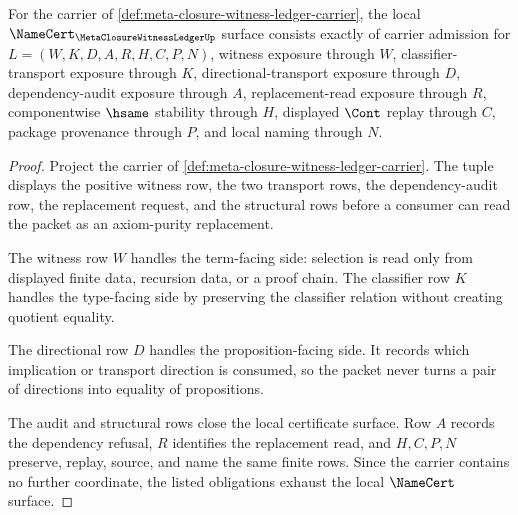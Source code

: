 \begin{theorem}
\label{thm:meta-closure-witness-ledger-namecert-obligations}
For the carrier of \autoref{def:meta-closure-witness-ledger-carrier}, the local $\NameCert_{\MetaClosureWitnessLedgerUp}$ surface consists exactly of carrier admission for $L=(W,K,D,A,R,H,C,P,N)$, witness exposure through $W$, classifier-transport exposure through $K$, directional-transport exposure through $D$, dependency-audit exposure through $A$, replacement-read exposure through $R$, componentwise $\hsame$ stability through $H$, displayed $\Cont$ replay through $C$, package provenance through $P$, and local naming through $N$.
\end{theorem}
\begin{proof}
Project the carrier of \autoref{def:meta-closure-witness-ledger-carrier}. The tuple displays the positive witness row, the two transport rows, the dependency-audit row, the replacement request, and the structural rows before a consumer can read the packet as an axiom-purity replacement.

The witness row $W$ handles the term-facing side: selection is read only from displayed finite data, recursion data, or a proof chain. The classifier row $K$ handles the type-facing side by preserving the classifier relation without creating quotient equality.

The directional row $D$ handles the proposition-facing side. It records which implication or transport direction is consumed, so the packet never turns a pair of directions into equality of propositions.

The audit and structural rows close the local certificate surface. Row $A$ records the dependency refusal, $R$ identifies the replacement read, and $H,C,P,N$ preserve, replay, source, and name the same finite rows. Since the carrier contains no further coordinate, the listed obligations exhaust the local $\NameCert$ surface.
\end{proof}

